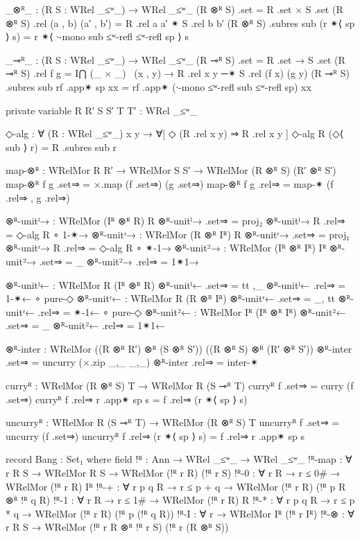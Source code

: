 \begin{code}
      _⊗ᴿ_ : (R S : WRel _≤ʷ_) → WRel _≤ʷ_
      (R ⊗ᴿ S) .set = R .set × S .set
      (R ⊗ᴿ S) .rel (a , b) (a′ , b′) = R .rel a a′ ✴ S .rel b b′
      (R ⊗ᴿ S) .subres sub (r ✴⟨ sp ⟩ s) =
        r ✴⟨ ∙-mono sub ≤ʷ-refl ≤ʷ-refl sp ⟩ s

      _⊸ᴿ_ : (R S : WRel _≤ʷ_) → WRel _≤ʷ_
      (R ⊸ᴿ S) .set = R .set → S .set
      (R ⊸ᴿ S) .rel f g =
        I⋂ (_ × _) \ (x , y) → R .rel x y ─✴ S .rel (f x) (g y)
      (R ⊸ᴿ S) .subres sub rf .app✴ sp xx =
        rf .app✴ (∙-mono ≤ʷ-refl sub ≤ʷ-refl sp) xx

      private
        variable
          R R′ S S′ T T′ : WRel _≤ʷ_

      ◇-alg : ∀ (R : WRel _≤ʷ_) {x y} → ∀[ ◇ (R .rel x y) ⇒ R .rel x y ]
      ◇-alg R (◇⟨ sub ⟩ r) = R .subres sub r

      map-⊗ᴿ : WRelMor R R′ → WRelMor S S′ → WRelMor (R ⊗ᴿ S) (R′ ⊗ᴿ S′)
      map-⊗ᴿ f g .set⇒ = ×.map (f .set⇒) (g .set⇒)
      map-⊗ᴿ f g .rel⇒ = map-✴ (f .rel⇒ , g .rel⇒)

      ⊗ᴿ-unitˡ→ : WRelMor (Iᴿ ⊗ᴿ R) R
      ⊗ᴿ-unitˡ→ .set⇒ = proj₂
      ⊗ᴿ-unitˡ→ {R} .rel⇒ = ◇-alg R ∘ 1-✴→
      ⊗ᴿ-unitʳ→ : WRelMor (R ⊗ᴿ Iᴿ) R
      ⊗ᴿ-unitʳ→ .set⇒ = proj₁
      ⊗ᴿ-unitʳ→ {R} .rel⇒ = ◇-alg R ∘ ✴-1→
      ⊗ᴿ-unit²→ : WRelMor (Iᴿ ⊗ᴿ Iᴿ) Iᴿ
      ⊗ᴿ-unit²→ .set⇒ = _
      ⊗ᴿ-unit²→ .rel⇒ = 1✴1→

      ⊗ᴿ-unitˡ← : WRelMor R (Iᴿ ⊗ᴿ R)
      ⊗ᴿ-unitˡ← .set⇒ = tt ,_
      ⊗ᴿ-unitˡ← .rel⇒ = 1-✴← ∘ pure-◇
      ⊗ᴿ-unitʳ← : WRelMor R (R ⊗ᴿ Iᴿ)
      ⊗ᴿ-unitʳ← .set⇒ = _, tt
      ⊗ᴿ-unitʳ← .rel⇒ = ✴-1← ∘ pure-◇
      ⊗ᴿ-unit²← : WRelMor Iᴿ (Iᴿ ⊗ᴿ Iᴿ)
      ⊗ᴿ-unit²← .set⇒ = _
      ⊗ᴿ-unit²← .rel⇒ = 1✴1←

      ⊗ᴿ-inter : WRelMor ((R ⊗ᴿ R′) ⊗ᴿ (S ⊗ᴿ S′)) ((R ⊗ᴿ S) ⊗ᴿ (R′ ⊗ᴿ S′))
      ⊗ᴿ-inter .set⇒ = uncurry (×.zip _,_ _,_)
      ⊗ᴿ-inter .rel⇒ = inter-✴

      curryᴿ : WRelMor (R ⊗ᴿ S) T → WRelMor R (S ⊸ᴿ T)
      curryᴿ f .set⇒ = curry (f .set⇒)
      curryᴿ f .rel⇒ r .app✴ sp s = f .rel⇒ (r ✴⟨ sp ⟩ s)

      uncurryᴿ : WRelMor R (S ⊸ᴿ T) → WRelMor (R ⊗ᴿ S) T
      uncurryᴿ f .set⇒ = uncurry (f .set⇒)
      uncurryᴿ f .rel⇒ (r ✴⟨ sp ⟩ s) = f .rel⇒ r .app✴ sp s

      record Bang : Set₁ where
        field
          !ᴿ : Ann → WRel _≤ʷ_ → WRel _≤ʷ_
          !ᴿ-map : ∀ {r R S} → WRelMor R S → WRelMor (!ᴿ r R) (!ᴿ r S)
          !ᴿ-0 : ∀ {r R} → r ≤ 0# → WRelMor (!ᴿ r R) Iᴿ
          !ᴿ-+ : ∀ {r p q R} → r ≤ p + q → WRelMor (!ᴿ r R) (!ᴿ p R ⊗ᴿ !ᴿ q R)
          !ᴿ-1 : ∀ {r R} → r ≤ 1# → WRelMor (!ᴿ r R) R
          !ᴿ-* : ∀ {r p q R} → r ≤ p * q → WRelMor (!ᴿ r R) (!ᴿ p (!ᴿ q R))
          !ᴿ-I : ∀ {r} → WRelMor Iᴿ (!ᴿ r Iᴿ)
          !ᴿ-⊗ : ∀ {r R S} → WRelMor (!ᴿ r R ⊗ᴿ !ᴿ r S) (!ᴿ r (R ⊗ᴿ S))


\end{code}
